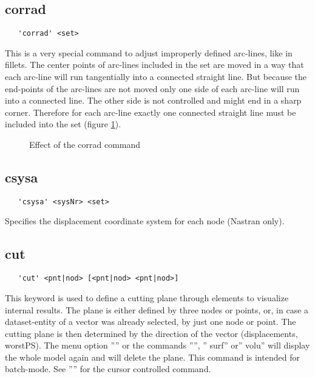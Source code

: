 \documentclass{article}
\begin{document}
\subsection{\label{corrad}corrad}
\begin{verbatim}
   'corrad' <set>
\end{verbatim}
This is a very special command to adjust improperly defined arc-lines, like in fillets. The center points of arc-lines included in the set are moved in a way that each arc-line will run tangentially into a connected straight line. But because the end-points of the arc-lines are not moved only one side of each arc-line will run into a connected line. The other side is not controlled and might end in a sharp corner. Therefore for each arc-line exactly one connected straight line must be included into the set (figure \ref{corradp}).

\begin{figure}[h]
\caption{\label{corradp} Effect of the corrad command }
\end{figure}

\subsection{\label{csysa}csysa}
\begin{verbatim}
   'csysa' <sysNr> <set>                                                               
\end{verbatim}
Specifies the displacement coordinate system for each node (Nastran only).

\subsection{\label{cut}cut}
\begin{verbatim}
   'cut' <pnt|nod> [<pnt|nod> <pnt|nod>]
\end{verbatim}
This keyword is used to define a cutting plane through elements to visualize internal results. The plane is either defined by three nodes or points, or, in case a dataset-entity of a vector was already selected, by just one node or point. The cutting plane is then determined by the direction of the vector (displacements, worstPS). The menu option '''' or the commands '''', '' surf'' or'' volu'' will display the whole model again and will delete the plane. This command is intended for batch-mode. See '''' for the cursor controlled command.
\end{document}
